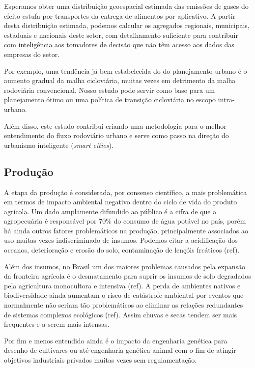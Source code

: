 \documentclass[14pt,a4paper]{article}
\begin{document}
	Esperamos obter uma distribuição geoespacial estimada das emissões de gases do efeito estufa por transportes da entrega de alimentos por aplicativo. A partir desta distribuição estimada, podemos calcular os agregados regionais, municipais, estaduais e nacionais deste setor, com detalhamento suficiente para contribuir com inteligência aos tomadores de decisão que não têm acesso aos dados das empresas do setor.
	
	Por exemplo, uma tendência já bem estabelecida do do planejamento urbano é o aumento gradual da malha cicloviária, muitas vezes em detrimento da malha rodoviária convencional. Nosso estudo pode servir como base para um planejamento ótimo ou uma política de transição cicloviária no escopo intra-urbano. 
	
	Além disso, este estudo contribui criando uma metodologia para o melhor entendimento do fluxo rodoviário urbano e serve como passo na direção do urbanismo inteligente (\textit{smart cities}). 
	
	\subsection{Produção}
	
	A etapa da produção é considerada, por consenso científico, a mais problemática em termos de impacto ambiental negativo dentro do ciclo de vida do produto agrícola. Um dado amplamente difundido ao público é a cifra de que a agropecuária é responsável por $70$\% do consumo de água potável no país, porém há ainda outros fatores problemáticos na produção, principalmente associados ao uso muitas vezes indiscriminado de insumos. Podemos citar a acidificação dos oceanos, deterioração e erosão do solo, contaminação de lençóis freáticos (ref).
	
	Além dos insumos, no Brasil um dos maiores problemas causados pela expansão da fronteira agrícola é o desmatamento para suprir os insumos de solo degradados pela agricultura monocultora e intensiva (ref). A perda de ambientes nativos e biodiversidade ainda aumentam o risco de catástrofe ambiental por eventos que normalmente não seriam tão problemáticos ao eliminar as relações redundantes de sistemas complexos ecológicos (ref). Assim chuvas e secas tendem ser mais frequentes e a serem mais intensas.
	
	Por fim e menos entendido ainda é o impacto da engenharia genética para desenho de cultivares ou até engenharia genética animal com o fim de atingir objetivos industriais privados muitas vezes sem regulamentação. 
	
\end{document}
